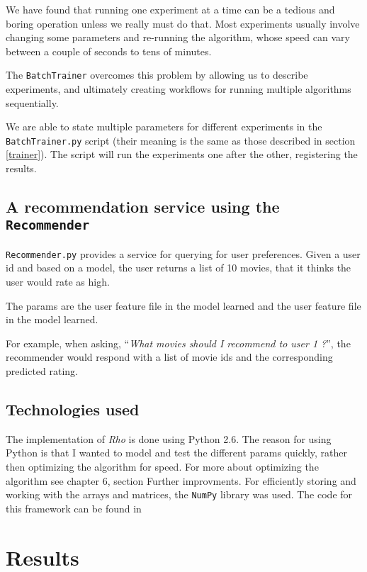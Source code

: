 \documentclass[11pt]{amsart}
\begin{document}
We have found that running one experiment at a time can be a tedious and boring operation unless we really must do that. Most experiments usually involve changing some parameters and re-running the algorithm, whose speed can vary between a couple of seconds to tens of minutes. 

The \texttt{BatchTrainer} overcomes this problem by allowing us to describe experiments, and ultimately creating workflows for running multiple algorithms sequentially. 

We are able to state multiple parameters for different experiments in the \texttt{BatchTrainer.py} script (their meaning is the same as those described in section \ref{trainer}). The script will run the experiments one after the other, registering the results. 

\subsection{A recommendation service using the \texttt{Recommender}}

\texttt{Recommender.py} provides a service for querying for user preferences. Given a user id and based on a model, the user returns a list of 10 movies, that it thinks the user would rate as high. 

The params are the user feature file in the model learned and the user feature file in the model learned.

For example, when asking, ``\emph{What movies should I recommend to user 1 ?}'', the recommender would respond with a list of movie ids and the corresponding predicted rating.

\subsection{Technologies used}
\label{tehcnologies}

The implementation of \emph{Rho} is done using Python 2.6. The reason for using Python is that I wanted to model and test the different params quickly, rather then optimizing the algorithm for speed. For more about optimizing the algorithm see chapter 6, section Further improvments. For efficiently storing and working with the arrays and matrices, the \texttt{NumPy} library \cite{numpy} was used. The code for this framework can be found in \cite{rho}


\section{Results}
\end{document}
